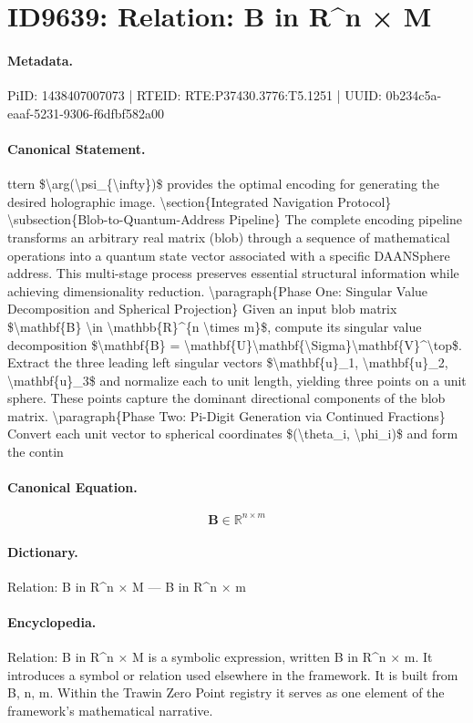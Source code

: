 \section*{ID9639: Relation: B in R\textasciicircum{}n × M}
\paragraph{Metadata.}
PiID: 1438407007073 | RTEID: RTE:P37430.3776:T5.1251 | UUID: 0b234c5a-eaaf-5231-9306-f6dfbf582a00

\paragraph{Canonical Statement.}
ttern \$\textbackslash{}arg(\textbackslash{}psi\_\{\textbackslash{}infty\})\$ provides the optimal encoding for generating the desired holographic image. \textbackslash{}section\{Integrated Navigation Protocol\} \textbackslash{}subsection\{Blob-to-Quantum-Address Pipeline\} The complete encoding pipeline transforms an arbitrary real matrix (blob) through a sequence of mathematical operations into a quantum state vector associated with a specific DAANSphere address. This multi-stage process preserves essential structural information while achieving dimensionality reduction. \textbackslash{}paragraph\{Phase One: Singular Value Decomposition and Spherical Projection\} Given an input blob matrix \$\textbackslash{}mathbf\{B\} \textbackslash{}in \textbackslash{}mathbb\{R\}\textasciicircum{}\{n \textbackslash{}times m\}\$, compute its singular value decomposition \$\textbackslash{}mathbf\{B\} = \textbackslash{}mathbf\{U\}\textbackslash{}mathbf\{\textbackslash{}Sigma\}\textbackslash{}mathbf\{V\}\textasciicircum{}\textbackslash{}top\$. Extract the three leading left singular vectors \$\textbackslash{}mathbf\{u\}\_1, \textbackslash{}mathbf\{u\}\_2, \textbackslash{}mathbf\{u\}\_3\$ and normalize each to unit length, yielding three points on a unit sphere. These points capture the dominant directional components of the blob matrix. \textbackslash{}paragraph\{Phase Two: Pi-Digit Generation via Continued Fractions\} Convert each unit vector to spherical coordinates \$(\textbackslash{}theta\_i, \textbackslash{}phi\_i)\$ and form the contin

\paragraph{Canonical Equation.}
\[
\mathbf{B} \in \mathbb{R}^{n \times m}
\]

\paragraph{Dictionary.}
Relation: B in R\textasciicircum{}n × M — B in R\textasciicircum{}n × m

\paragraph{Encyclopedia.}
Relation: B in R\textasciicircum{}n × M is a symbolic expression, written B in R\textasciicircum{}n × m. It introduces a symbol or relation used elsewhere in the framework. It is built from B, n, m. Within the Trawin Zero Point registry it serves as one element of the framework's mathematical narrative.
